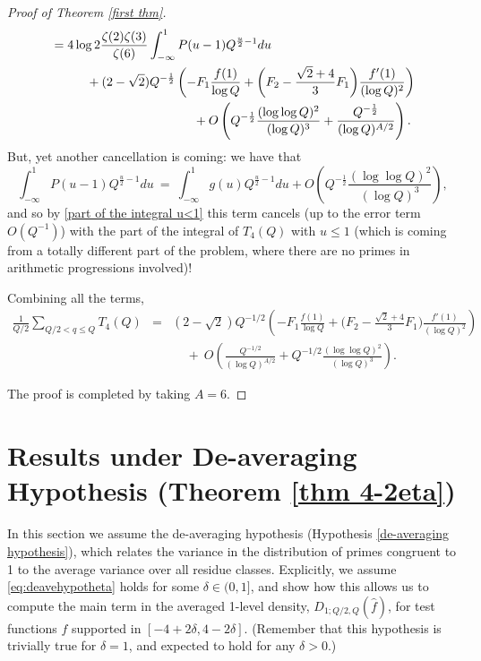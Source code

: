 \documentclass[12pt,reqno]{amsart}
\numberwithin{equation}{section}
\theoremstyle{plain}
\begin{document}
\begin{proof}[Proof of Theorem \ref{first thm}]
\begin{align}
&= 4 \log 2 \frac{\zeta(2)\zeta(3)}{\zeta(6)} \int_{-\infty}^{1} P(u-1)Q^{\frac u2-1}du
 \notag \\
&\hspace{1cm}+(2-\sqrt 2) Q^{-\frac 12}\left(- F_1 \frac{f(1)}{\log Q}+ \bigg(F_2-\frac{\sqrt 2+4}3 F_1\bigg) \frac{f'(1)}{(\log Q)^2} \right) \notag \\
&\hspace{4cm}+O\left( Q^{-\frac 12}\frac {(\log\log Q)^2}{(\log Q)^3} + \frac{Q^{-\frac 12}}{(\log Q)^{A/2}} \right).
\end{align}
But, yet another cancellation is coming: we have that
\begin{equation} \int_{-\infty}^{1} P(u-1)Q^{\frac u2-1}du\ =\ \int_{-\infty}^{1} g(u)Q^{\frac u2-1}du+O\left( Q^{-\frac 12}\frac {(\log\log Q)^2}{(\log Q)^3}\right),\end{equation}
and so by \eqref{part of the integral u<1} this term cancels (up to the error term $O(Q^{-1})$) with the part of the integral of $T_4(Q)$ with $u\leq 1$ (which is coming from a totally different part of the problem, where there are no primes in arithmetic progressions involved)!

Combining all the terms,
\begin{eqnarray} \frac 1{Q/2} \sum_{Q/2<q\leq Q}T_4(Q) & = & (2-\sqrt 2) Q^{-1/2}\left(- F_1 \frac{f(1)}{\log Q}+ \bigg(F_2-\frac{\sqrt 2+4}3 F_1\bigg) \frac{f'(1)}{(\log Q)^2} \right)\nonumber\\  & & \ \ \ \ \ +\ O\left(\frac {Q^{-1/2}}{(\log Q)^{A/2}}+Q^{-1/2}\frac {(\log\log Q)^2}{(\log Q)^3}\right).
\end{eqnarray}

The proof is completed by taking $A=6$.

\end{proof}

\section{Results under De-averaging Hypothesis (Theorem \ref{thm 4-2eta})}\label{sec:proofthm42eta}

In this section we assume the de-averaging hypothesis (Hypothesis \ref{de-averaging hypothesis}), which relates the variance in the distribution of primes congruent to 1 to the average variance over all residue classes. Explicitly, we assume \eqref{eq:deavehypotheta} holds for some $\delta \in (0,1]$, and show how this allows us to compute the main term in the averaged 1-level density, $D_{1;Q/2,Q}(\widehat{f})$, for test functions $f$ supported in $[-4+2\delta, 4-2\delta]$. (Remember that this hypothesis is trivially true for $\delta = 1$, and expected to hold for any $\delta>0$.)
\end{document}
